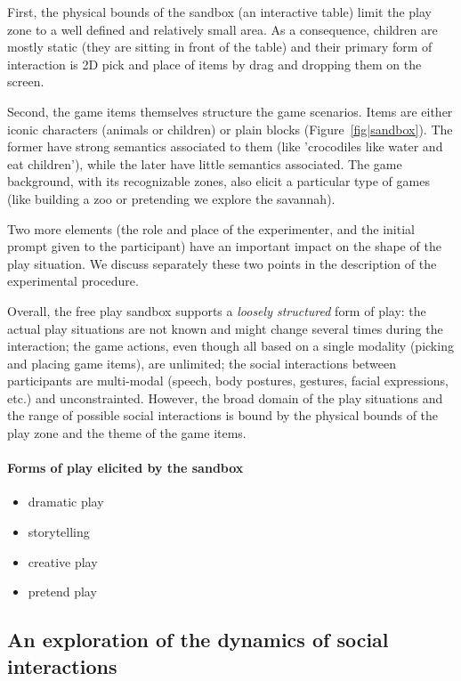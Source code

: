 \documentclass[sigconf]{acmart}
\begin{document}
First, the physical bounds of the sandbox (an interactive table) limit the
play zone to a well defined and relatively small area. As a consequence,
children are mostly static (they are sitting in front of the table) and their
primary form of interaction is 2D pick and place of items by drag and dropping
them on the screen.

Second, the game items themselves structure the game scenarios. Items are either
iconic characters (animals or children) or plain blocks
(Figure~\ref{fig|sandbox}). The former have strong semantics associated to them
(like 'crocodiles like water and eat children'), while the later have little
semantics associated. The game background, with its recognizable zones, also
elicit a particular type of games (like building a zoo or pretending we explore
the savannah).

Two more elements (the role and place of the experimenter, and the initial
prompt given to the participant) have an important impact on the shape of the
play situation. We discuss separately these two points in the description of the
experimental procedure.

Overall, the free play sandbox supports a \emph{loosely structured} form of play: the
actual play situations are not known and might change several times during the
interaction; the game actions, even though all based on a single modality (picking and
placing game items), are unlimited; the social interactions between participants
are multi-modal (speech, body postures, gestures, facial expressions, etc.) and
unconstrainted. However, the broad domain of the play situations and the range of
possible social interactions is bound by the physical bounds of the play zone
and the theme of the game items.

\paragraph{Forms of play elicited by the sandbox}

\begin{itemize}
    \item dramatic play
    \item storytelling
    \item creative play
    \item pretend play
\end{itemize}

\subsection{An exploration of the dynamics of social interactions}
\end{document}
